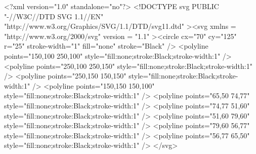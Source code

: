 <?xml version="1.0" standalone="no"?> <!DOCTYPE svg PUBLIC "-//W3C//DTD SVG 1.1//EN" "http://www.w3.org/Graphics/SVG/1.1/DTD/svg11.dtd" ><svg xmlns = "http://www.w3.org/2000/svg" version = "1.1" ><circle cx="70" cy="125" r="25" stroke-width="1" fill="none" stroke="Black" />
<polyline points="150,100 250,100" style="fill:none;stroke:Black;stroke-width:1" />
<polyline points="250,100 250,150" style="fill:none;stroke:Black;stroke-width:1" />
<polyline points="250,150 150,150" style="fill:none;stroke:Black;stroke-width:1" />
<polyline points="150,150 150,100" style="fill:none;stroke:Black;stroke-width:1" />
<polyline points="65,50 74,77" style="fill:none;stroke:Black;stroke-width:1" />
<polyline points="74,77 51,60" style="fill:none;stroke:Black;stroke-width:1" />
<polyline points="51,60 79,60" style="fill:none;stroke:Black;stroke-width:1" />
<polyline points="79,60 56,77" style="fill:none;stroke:Black;stroke-width:1" />
<polyline points="56,77 65,50" style="fill:none;stroke:Black;stroke-width:1" />
</svg>